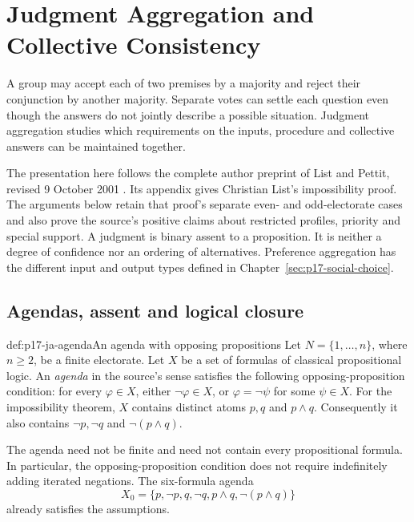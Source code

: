 \chapter{Judgment Aggregation and Collective Consistency}
\label{sec:p17-judgment-aggregation}

A group may accept each of two premises by a majority and reject their
conjunction by another majority. Separate votes can settle each question even
though the answers do not jointly describe a possible situation. Judgment
aggregation studies which requirements on the inputs,
procedure and collective answers can be maintained together.

The presentation here follows the complete author preprint of List and Pettit,
revised 9 October 2001 \cite{ListPettit2001JudgmentPreprint}. Its appendix gives
Christian List's impossibility proof. The arguments below retain that proof's
separate even- and odd-electorate cases and also prove the source's positive
claims about restricted profiles, priority and special support. A judgment is
binary assent to a proposition. It is neither a degree of confidence nor an
ordering of alternatives. Preference aggregation has the different input and
output types defined in Chapter~\ref{sec:p17-social-choice}.

\section{Agendas, assent and logical closure}
\label{sec:p17-ja-agendas}

\begin{hbdefinition}{def:p17-ja-agenda}{An agenda with opposing propositions}
Let \(N=\{1,\ldots,n\}\), where \(n\geq2\), be a finite electorate. Let
\(X\) be a set of formulas of classical propositional logic. An \emph{agenda}
in the source's sense satisfies the following opposing-proposition condition:
for every \(\varphi\in X\), either \(\neg\varphi\in X\), or
\(\varphi=\neg\psi\) for some \(\psi\in X\).
For the impossibility theorem, \(X\) contains distinct atoms \(p,q\) and
\(p\land q\). Consequently it also contains \(\neg p,\neg q\) and
\(\neg(p\land q)\).

The agenda need not be finite and need not contain every propositional formula.
In particular, the opposing-proposition condition does not require indefinitely
adding iterated negations. The six-formula agenda
\[
 X_0=\{p,\neg p,q,\neg q,p\land q,\neg(p\land q)\}
\]
already satisfies the assumptions.
\end{hbdefinition}


